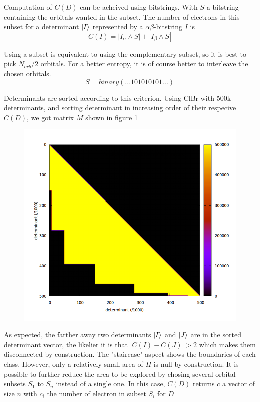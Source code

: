 \documentclass[./thesis.tex]{subfiles}
\begin{document}
Computation of $C(D)$ can be acheived using bitstrings. With $S$ a bitstring containing the orbitals wanted in the subset. The number of electrons in this subset for a determinant $\ket I$ represented by a $\alpha \beta$-bitstring $I$ is
\begin{equation}
C(I)=|I_{\alpha} \wedge S|+|I_{\beta} \wedge S|
\end{equation}

Using a subset is equivalent to using the complementary subset, so it is best to pick $N_{orb}/2$ orbitals. For a better entropy, it is of course better to interleave the chosen orbitals.
\begin{equation}
S=binary(...101010101...)
\end{equation}
    
Determinants are sorted according to this criterion. Using ClBr with 500k determinants, and sorting determinant in increasing order of their respecive $C(D)$, we got matrix $M$ shown in figure \ref{fig:num_subspace}

\begin{figure}[h!]
	\begin{center}
		\includegraphics[width=0.6\columnwidth]{figures/davidson/num_subspace}
		\caption{{\label{fig:num_subspace}
		}}
	\end{center}
\end{figure}
    
As expected, the farther away two determinants $\ket I$ and $\ket J$ are in the sorted determinant vector, the likelier it is that $|C(I)-C(J)| > 2$ which makes them disconnected by construction. The "staircase" aspect shows the boundaries of each class.
However, only a relatively small area of $H$ is null by construction. It is possible to further reduce the area to be explored by chosing several orbital subsets $S_1$ to $S_n$ instead of a single one. In this case, $C(D)$ returns $c$ a vector of size $n$ with $c_{i}$ the number of electron in subset $S_i$ for $D$
\end{document}
